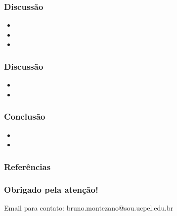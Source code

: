 \documentclass{beamer}
\begin{document}
\begin{frame}
\frametitle{Discussão}
    \begin{itemize}
        \item 
        \item
        \item
    \end{itemize}

\end{frame}

\begin{frame}
\frametitle{Discussão}

    \begin{itemize}
        \item
        \item
    \end{itemize}

\end{frame}

\begin{frame}
\frametitle{Conclusão}

    \begin{itemize}
        \item
        \item
    \end{itemize}

\end{frame}

\begin{frame}[shrink=20]
\frametitle{Referências}

\printbibliography

\end{frame}

\begin{frame}
\frametitle{Obrigado pela atenção!}

    \begin{block}{Email para contato:}
        bruno.montezano@sou.ucpel.edu.br
    \end{block}

\end{frame}
\end{document}
